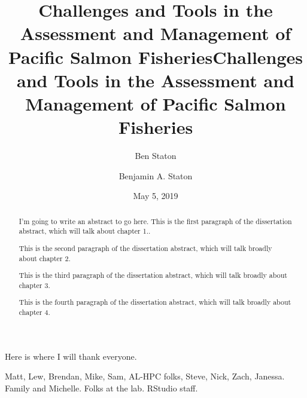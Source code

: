 \documentclass[12pt,]{book}
\title{Challenges and Tools in the Assessment and Management of Pacific Salmon
Fisheries}
\author{Ben Staton}
\date{}
\title{Challenges and Tools in the Assessment and Management of Pacific Salmon Fisheries}
\author{Benjamin A. Staton}
\date{May 5, 2019} %
\theoremstyle{definition}
\theoremstyle{definition}
\theoremstyle{definition}
\theoremstyle{remark}
\begin{document}
\maketitle

\begin{romanpages}      %

\TitlePage 

\doublespacing
\setlength{\parskip}{0pt plus 0pt minus 0pt}

\begin{abstract} 
\noindent
I'm going to write an abstract to go here. This is the first paragraph of the dissertation abstract, which will talk about chapter 1..

This is the second paragraph of the dissertation abstract, which will talk broadly about chapter 2.

This is the third paragraph of the dissertation abstract, which will talk broadly about chapter 3.

This is the fourth paragraph of the dissertation abstract, which will talk broadly about chapter 4.
\end{abstract}

\begin{acknowledgments}
\noindent
Here is where I will thank everyone.

Matt, Lew, Brendan, Mike, Sam, AL-HPC folks, Steve, Nick, Zach, Janessa. Family and Michelle. Folks at the lab. RStudio staff.
\end{acknowledgments}

\begin{singlespace}
	\tableofcontents
	\clearpage
	\listoffigures
	\clearpage
	\listoftables
\end{singlespace}

\end{romanpages}        %

\normalem       %

\end{document}
